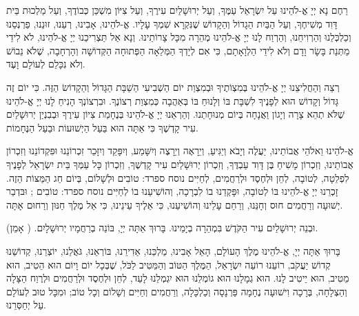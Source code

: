 רַחֶם נָא יְיָ אֱ-לֹהֵינוּ עַל יִשְׂרָאֵל עַמֶּךָ, וְעַל יְרוּשָׁלַיִם עִירֶךָ, וְעַל צִיּוֹן מִשְׁכַּן כְּבוֹדֶךָ, וְעַל מַלְכוּת בֵּית דָּוִד מְשִׁיחֶךָ, וְעַל הַבַּיִת הַגָדוֹל וְהַקָדוֹשׁ שֶׁנִּקְרָא שִׁמְךָ עָלָיו. אֱ-לֹהֵינוּ, אָבִינוּ, רְעֵנוּ, זוּנֵנוּ, פַרְנְסֵנוּ וְכַלְכְּלֵנוּ וְהַרְוִיחֵנוּ, וְהַרְוַח לָנוּ יְיָ אֱ-לֹהֵינוּ מְהֵרָה מִכָּל צָרוֹתֵינוּ. וְנָא אַל תַּצְרִיכֵנוּ יְיָ אֱ-לֹהֵינוּ, לֹא לִידֵי מַתְּנַת בָּשָׂר וָדָם וְלֹא לִידֵי הַלְוָאָתָם, כִּי אִם לְיָדְךָ הַמְּלֵאָה הַפְּתוּחָה הַקְּדוֹשָׁה וְהָרְחָבָה, שֶׁלֹא נֵבוֹשׁ וְלֹא נִכָּלֵם לְעוֹלָם וָעֶד.

\break
\begin{framed}

רְצֵה וְהַחֲלִיצֵנוּ יְיָ אֱ-לֹהֵינוּ בְּמִצְוֹתֶיךָ וּבְמִצְוַת יוֹם הַשְׁבִיעִי הַשַׁבָּת הַגָּדוֹל וְהַקָדוֹשׂ הַזֶּה. כִּי יוֹם זֶה גָּדוֹל וְקָדוֹשׁ הוּא לְפָנֶיךָ לִשְׁבָּת בּוֹ וְלָנוּחַ בּוֹ בְּאַהֲבָה כְּמִצְוַת רְצוֹנֶךָ. וּבִרְצוֹנְךָ הָנִיחַ לָנוּ יְיָ אֱ-לֹהֵינוּ שֶׁלֹּא תְהֵא צָרָה וְיָגוֹן וַאֲנָחָה בְּיוֹם מְנוּחָתֵנוּ. וְהַרְאֵנוּ יְיָ אֱ-לֹהֵינוּ בְּנֶחָמַת צִיוֹן עִירֶךָ וּבְבִנְיַן יְרוּשָׁלַיִם עִיר קָדְשֶׁךָ כִּי אַתָּה הוּא בַּעַל הַיְשׁוּעוֹת וּבַעַל הַנֶּחָמוֹת.
\end{framed}

אֱ-לֹהֵינוּ וֵאלֹהֵי אֲבוֹתֵינוּ, יַעֲלֶה וְיָבֹא וְיַגִּיעַ, וְיֵרָאֶה וְיֵרָצֶה וְיִשָּׁמַע, וְיִפָּקֵד וְיִזָּכֵר זִכְרוֹנֵנוּ וּפִקְדוֹנֵנוּ וְזִכְרוֹן אֲבוֹתֵינוּ, וְזִכְרוֹן מָשִׁיחַ בֶּן דָּוִד עַבְדֶּךָ, וְזִכְרוֹן יְרוּשָׁלַיִם עִיר קָדְשֶׁךָ, וְזִכְרוֹן כָּל עַמְּךָ בֵּית יִשְׂרָאֵל לְפָנֶיךָ לִפְלֵטָה, לְטוֹבָה, לְחֵן וּלְחֶסֶד וּלְרַחֲמִים, לְחַיִּים נוסח ספרד: טוֹבִים וּלְשָׁלוֹם, בְּיוֹם חַג הַמַּצּוֹת הַזֶה. זָכְרֵנוּ יְיָ אֱ-לֹהֵינוּ בּוֹ לְטוֹבָה, וּפָּקְדֵנוּ בוֹ לִבְרָכָה, וְהוֹשִׁיעֵנוּ בוֹ לְחַיִּים נוסח ספרד: טוֹבִים ; וּבּדְבַר יְשׁוּעָה וְרַחֲמִים חוּס וְחָנֵּנוּ, וְרַחֵם עָלֵינוּ וְהוֹשִׁיעֵנוּ, כִּי אֵלֶיךָ עֵינֵינוּ, כִּי אֵל מֶלֶךְ חַנּוּן וְרַחוּם אָתָּה.

וּבְנֵה יְרוּשָׁלַיִם עִיר הַקֹּדֶשׁ בִּמְהֵרָה בְיָמֵינוּ. בָּרוּךְ אַתָּה יְיָ, בּוֹנֵה בְרַחֲמָיו יְרוּשָׁלָיִם. ( אָמֵן).

בָּרוּךְ אַתָּה יְיָ, אֱ-לֹהֵינוּ מֶלֶךְ הָעוֹלָם, הָאֵל אָבִינוּ, מַלְכֵּנוּ, אַדִירֵנוּ, בּוֹרְאֵנוּ, גֹּאֲלֵנוּ, יוֹצְרֵנוּ, קְדוֹשֵׁנוּ קְדוֹשׁ יַעֲקֹב, רוֹעֵנוּ רוֹעֵה יִשְׂרָאַל, הַמֶּלֶךְ הַטּוֹב וְהַמֵּטִיב לַכֹּל, שֶׁבְּכָל יוֹם וָיוֹם הוּא הֵטִיב, הוּא מֵטִיב, הוּא יֵיטִיב לָנוּ. הוּא גְמָלָנוּ הוּא גוֹמְלֵנוּ הוּא יִגְמְלֵנוּ לָעַד, לְחֵן וּלְחֶסֶד וּלְרַחֲמִים וּלְרֶוַח הַצָּלָה וְהַצְלָחָה, בְּרָכָה וִישׁוּעָה נֶחָמָה פַּרְנָסָה וְכַלְכָּלָה, וְרַחֲמִים וְחַיִּים וְשָׁלוֹם וְכָל טוֹב; וּמִכָּל טוּב לְעוֹלָם עַל יְחַסְּרֵנוּ.

